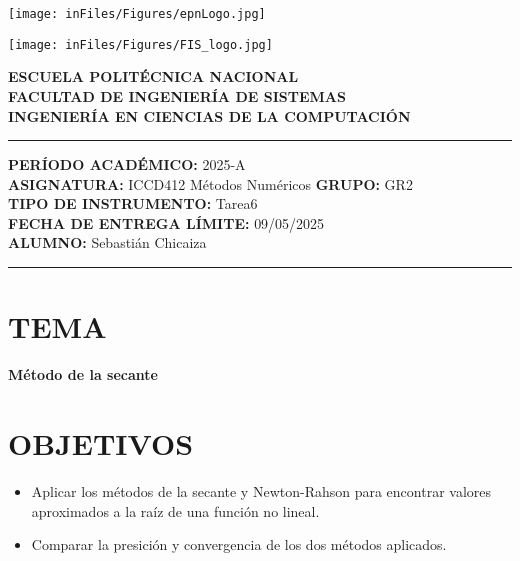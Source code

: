 \documentclass[12pt]{article}
\begin{document}
\begin{minipage}{0.45\textwidth}
    \texttt{[image: inFiles/Figures/epnLogo.jpg]}
\end{minipage}
\hfill
\begin{minipage}{0.45\textwidth}
    \raggedleft
    \texttt{[image: inFiles/Figures/FIS\_logo.jpg]}
\end{minipage}

\vspace{0.5cm}

\begin{center}
    \textbf{ESCUELA POLITÉCNICA NACIONAL}\\[0.2cm]
    \textbf{FACULTAD DE INGENIERÍA DE SISTEMAS}\\[0.2cm]
    \textbf{INGENIERÍA EN CIENCIAS DE LA COMPUTACIÓN}
\end{center}

\vspace{0.5cm}
\hrule
\vspace{0.5cm}

\noindent\textbf{PERÍODO ACADÉMICO:} 2025-A\\[0.2cm]
\noindent\textbf{ASIGNATURA:} ICCD412 Métodos Numéricos \hfill \textbf{GRUPO:} GR2\\[0.2cm]
\noindent\textbf{TIPO DE INSTRUMENTO:} Tarea6\\[0.2cm]
\noindent\textbf{FECHA DE ENTREGA LÍMITE:} {09/05/2025}\\[0.2cm]
\noindent\textbf{ALUMNO:} {Sebastián Chicaiza}

\vspace{0.5cm}
\hrule
\vspace{1cm}


\section*{TEMA}

\begin{center}
    \Large\textbf{Método de la secante}
\end{center}
\vspace{0.5cm}

\section*{OBJETIVOS}
\begin{itemize}
    \item {Aplicar los métodos de la secante y Newton-Rahson para encontrar valores aproximados a la raíz de una función no lineal.}
    \item {Comparar la presición y convergencia de los dos métodos aplicados.}
\end{itemize}
\vspace{0.5cm}
\end{document}
